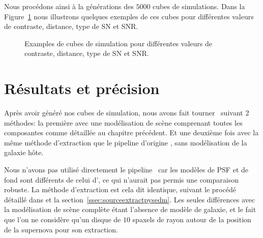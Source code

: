 \documentclass[../main/main.tex]{subfiles}
\begin{document}
Nous procédons ainsi à la générations des $5000$ cubes de
simulations. Dans la Figure~\ref{fig:examplesimu} nous illustrons
quelques exemples de ces cubes pour différentes valeurs de contraste,
distance, type de SN et SNR.
\begin{figure}[ht]
  \centering
  \caption[Examples de cubes de simulation.]{Examples de cubes de
    simulation pour différentes valeurs de contraste, distance, type de
    SN et SNR.}
  \label{fig:examplesimu}
\end{figure}

\section{Résultats et précision}\label{sec:simuresult}

Après avoir généré nos cubes de simulation, nous avons fait tourner
\hypergal\ suivant 2 méthodes: la première avec une modélisation de
scène comprenant toutes les composantes comme détaillée au chapitre
précédent. Et une deuxième fois avec la même méthode d'extraction que le
pipeline d'origine \pysedm, sans modélisation de la galaxie hôte.

Nous n'avons pas utilisé directement le pipeline \pysedm\ car les modèles
de PSF et de fond sont différents de celui d'\hypergal, ce qui n'aurait
pas permis une comparaison robuste. La méthode d'extraction est cela dit
identique, suivant le procédé détaillé dans \citet{pysedm} et la section~\ref{ssec:sourceextractpysedm}.
Les seules différences avec la modélisation de scène complète étant
l'absence de modèle de galaxie, et le fait que l'on ne considère qu'un
disque de $10$ spaxels de rayon autour de la position de la supernova
pour son extraction.
\end{document}
